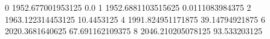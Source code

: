 0 1952.677001953125 0.0
1 1952.6881103515625 0.0111083984375
2 1963.122314453125 10.4453125
4 1991.824951171875 39.14794921875
6 2020.3681640625 67.691162109375
8 2046.210205078125 93.533203125
